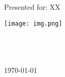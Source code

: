 \begin{titlepage}
    \begin{center}
        \Huge
        \textbf{}

        \vspace{0.5cm}

        \LARGE
        

        \vspace{1.5cm}

        \textbf{}

        \vfill
        
        Presented for: XX

        \vspace{2cm}

        \texttt{[image: img.png]}

        \Large
        \\
        \\
        \\
        \today

    \end{center}
\end{titlepage}